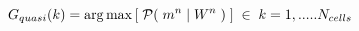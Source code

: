 \vspace{-0.1cm}
\begin{equation}
    G_{quasi}(k) = \arg\max\left[\; \mathcal{P}(\;m^n \;|\; W^n\;)\;\right] \; \in \; k = 1,.....N_{cells}
    \label{eq:classification}
    \vspace{-0.05cm}
\end{equation}